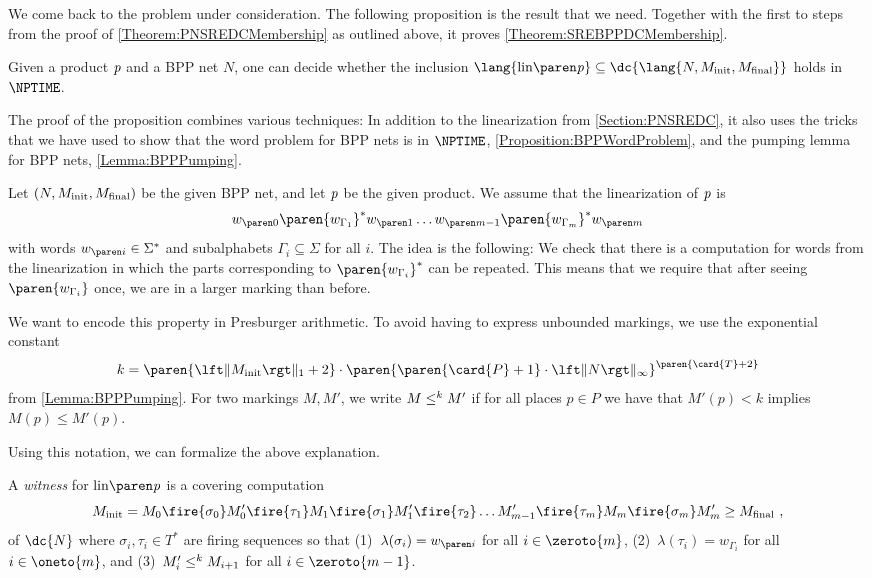 \documentclass[../../diss.tex]{subfiles}
\begin{document}
We come back to the problem under consideration.
The following proposition is the result that we need.
Together with the first to steps from the proof of \cref{Theorem:PNSREDCMembership} as outlined above, it proves \cref{Theorem:SREBPPDCMembership}.

\begin{proposition}%
\label{Proposition:BPPLinearizationInclusion}%
    Given a product $\mathit{p}$ and a BPP net $N$, one can decide whether the inclusion
    $\lang{\linof{\product}} \subseteq \dc{\lang{N,\Minit,\Mfinal}}$
    holds in $\NPTIME$.
\end{proposition}

The proof of the proposition combines various techniques:
In addition to the linearization from \cref{Section:PNSREDC}, it also uses the tricks that we have used to show that the word problem for BPP nets is in $\NPTIME$, \cref{Proposition:BPPWordProblem}, and the pumping lemma for BPP nets, \cref{Lemma:BPPPumping}.

%
\cheatpagebreak
%

Let $(N,M_{\text{init}},M_{\text{final}})$ be the given BPP net, and let $\mathit{p}$ be the given product.
We assume that the linearization of $\mathit{p}$ is
\[
    \dtr{w}{0} \paren{w_{\Gamma_1}}^* \dtr{w}{1} \ldots \dtr{w}{m-1} \paren{w_{\Gamma_m}}^* \dtr{w}{m}
\]
with words $\dtr{w}{i} \in \Sigma^*$ and subalphabets $\Gamma_i \subseteq \Sigma$ for all $i$.
The idea is the following:
We check that there is a computation for words from the linearization in which the parts corresponding to $\paren{w_{\Gamma_i}}^*$ can be repeated.
This means that we require that after seeing $\paren{w_{\Gamma_i}}$ once, we are in a larger marking than before.

We want to encode this property in Presburger arithmetic.
To avoid having to express unbounded markings, we use the exponential constant
\[
    k = \paren{\normone{\Minit}+2} \cdot \paren{ \paren{\card{P}+1} \cdot \norminf{N}}^{ \paren{\card{T} + 2} }
\]
from \cref{Lemma:BPPPumping}.
For two markings $M, M'$, we write $M \leq^k M'$ if for all places $p\in P$ we have that $M'(p) < k$ implies $M(p) \leq M'(p)$.

Using this notation, we can formalize the above explanation.

\begin{definition}%
\label{Definition:BPPWitness}%
    A \emph{witness} for $\linof{\product}$ is a covering computation
    \[
        \Minit
        =
        M_0 \fire{\sigma_0} M_0'
        \fire{\tau_1}
        M_1 \fire{\sigma_1} M_1'
        \fire{\tau_2}
        \ldots
        M_{m-1}'
        \fire{\tau_{m}}
        M_m \fire{\sigma_m} M_m'
        \geq \Mfinal
        \ ,
    \]
    of $\dc{N}$ where $\sigma_i, \tau_i \in T^*$ are firing sequences so that
    (1)~$\lambda(\sigma_i) = \dtr{w}{i}$ for all $i \in  \zeroto{m}$,
    (2)~$\lambda(\tau_i) = w_{\Gamma_i}$ for all $i \in \oneto{m}$, and
    (3)~$M_i'\leq^k M_{i+1}$ for all $i \in \zeroto{m-1}$.
\end{definition}
\end{document}
